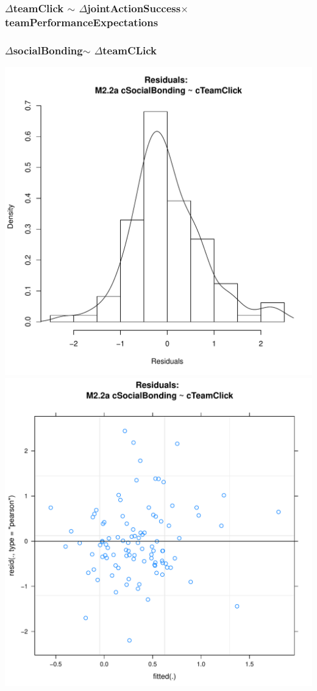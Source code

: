 \documentclass[12pt]{report}
\begin{document}
\subsubsection{$\Delta$teamClick $\sim$ $\Delta$jointActionSuccess$\times$ teamPerformanceExpectations}
\centering



\newpage
\subsubsection{$\Delta$socialBonding$\sim$ $\Delta$teamCLick}

\newpage
\centering


\newpage
\centering
\includegraphics[scale =.4]{../images/MLM22aHist.pdf}
\includegraphics[scale =.4]{../images/MLM22aScatter.pdf}
\end{document}
